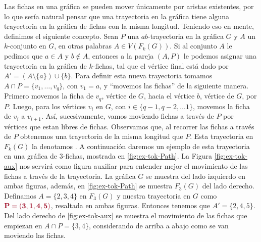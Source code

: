 Las fichas en una gr\'afica se pueden mover \'unicamente por aristas existentes,
por lo que ser\'ia natural pensar que una trayectoria en la gr\'afica tiene
alguna trayectoria en la gr\'afica de fichas con la misma longitud. Teniendo eso
en mente, definimos el siguiente concepto. Sean $P$ una $ab$-trayectoria en la
gr\'afica $G$ y $A$ un $k$-conjunto en $G$, en otras palabras $A \in V(F_k(G))$.
Si al conjunto $A$ le pedimos que $a\in A$ y $b \notin A$, entonces a la pareja
$(A,P)$ le podemos asignar una trayectoria en la gr\'afica de $k$-fichas, tal
que el v\'ertice final est\'a dado por $A'=(A \setminus \{a\}) \cup \{b\}$. Para
definir esta nueva trayectoria tomamos $A\cap P =\{v_1, \dots, v_q\}$, con $v_1
= a$, y ``movemos las fichas'' de la siguiente manera. Primero movemos la ficha
de $v_q$, v\'ertice de $G$, hacia el v\'ertice $b$, v\'ertice de $G$, por $P$.
Luego, para los v\'ertices $v_i$ en $G$, con $i \in \{q-1, q-2, \dots 1\}$,
movemos la ficha de $v_i$ a $v_{i+1}$. As\'i, sucesivamente, vamos moviendo
fichas a trav\'es de $P$ por v\'ertices que estan libres de fichas. Observamos
que, al recorrer las fichas a trav\'es de $P$ obtenemos una trayectoria de la
misma longitud que $P$. Esta trayectoria en $F_k(G)$ la denotamos
. A continuaci\'on daremos un
ejemplo de esta trayectoria en una gr\'afica de $3$-fichas, mostrada en
\cref{fig:ex-tok-Path}. La Figura \ref{fig:ex-tok-aux} nos servir\'a como figura
auxiliar para entender mejor el movimiento de las fichas a trav\'es de la
trayectoria. La gr\'afica $G$ se muestra del lado izquierdo en ambas figuras,
adem\'as, en \cref{fig:ex-tok-Path} se muestra $F_3(G)$ del lado derecho.
Definamos $A=\{2,3,4\}$ en $F_3(G)$ y nuestra trayectoria en $G$ como
${\color{vino}\bf P= (3,1,4,5)}$, resaltada en ambas figuras. Entonces tenemos
que $A'=\{2,4,5\}$. Del lado derecho de \cref{fig:ex-tok-aux} se muestra el
movimiento de las fichas que empiezan en $A \cap P =\{3,4\}$, considerando de
arriba a abajo como se van moviendo las fichas.

